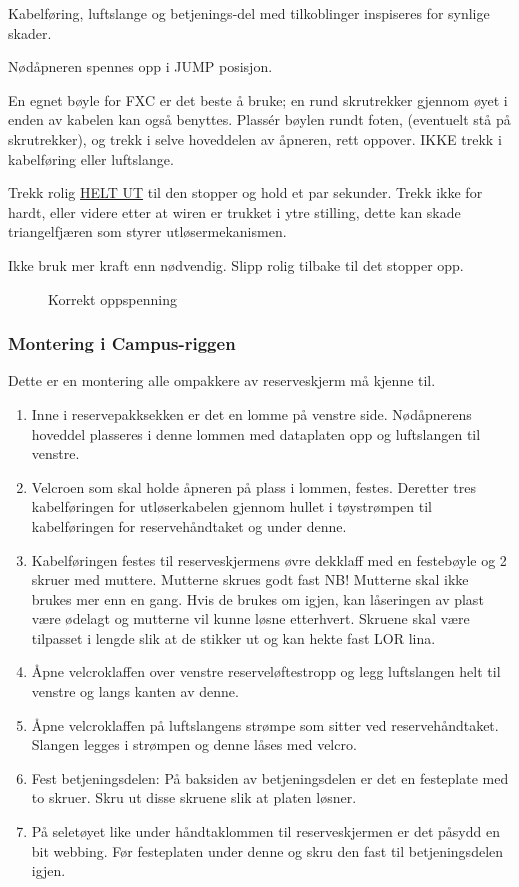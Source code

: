 Kabelføring, luftslange og betjenings-del med tilkoblinger inspiseres for synlige skader.

Nødåpneren spennes opp i JUMP posisjon.

En egnet bøyle for FXC er det beste å bruke; en rund skrutrekker gjennom øyet i enden av kabelen kan også benyttes. Plassér bøylen rundt foten, (eventuelt stå på skrutrekker), og trekk i selve hoveddelen av åpneren, rett oppover. IKKE trekk i kabelføring eller luftslange.

Trekk rolig \underline{HELT UT} til den stopper og hold et par sekunder. Trekk ikke for hardt, eller videre etter at wiren er trukket i ytre stilling, dette kan skade triangelfjæren som styrer utløsermekanismen.

Ikke bruk mer kraft enn nødvendig. Slipp rolig tilbake til det stopper opp.

\begin{figure}
	\caption{Korrekt oppspenning}
\end{figure}

\subsubsection{Montering i Campus-riggen}
Dette er en montering alle ompakkere av reserveskjerm må kjenne til.
\begin{enumerate}
\item Inne i reservepakksekken er det en lomme på venstre side. Nødåpnerens hoveddel plasseres i denne lommen med dataplaten opp og luftslangen til venstre.
\item Velcroen som skal holde åpneren på plass i lommen, festes. Deretter tres kabelføringen for utløserkabelen gjennom hullet i tøystrømpen til kabelføringen for reservehåndtaket og under denne.
\item Kabelføringen festes til reserveskjermens øvre dekklaff med en festebøyle og 2 skruer med muttere. Mutterne skrues godt fast NB! Mutterne skal ikke brukes mer enn en gang. Hvis de brukes om igjen, kan låseringen av plast være ødelagt og mutterne vil kunne løsne etterhvert. Skruene skal være tilpasset i lengde slik at de stikker ut og kan hekte fast LOR lina.
\item Åpne velcroklaffen over venstre reserveløftestropp og legg luftslangen helt til venstre og langs kanten av denne.
\item Åpne velcroklaffen på luftslangens strømpe som sitter ved reservehåndtaket. Slangen legges i strømpen og denne låses med velcro.
\item Fest betjeningsdelen: På baksiden av betjeningsdelen er det en festeplate med to skruer. Skru ut disse skruene slik at platen løsner.
\item På seletøyet like under håndtaklommen til reserveskjermen er det påsydd en bit webbing. Før festeplaten under denne og skru den fast til betjeningsdelen igjen.
\end{enumerate}

